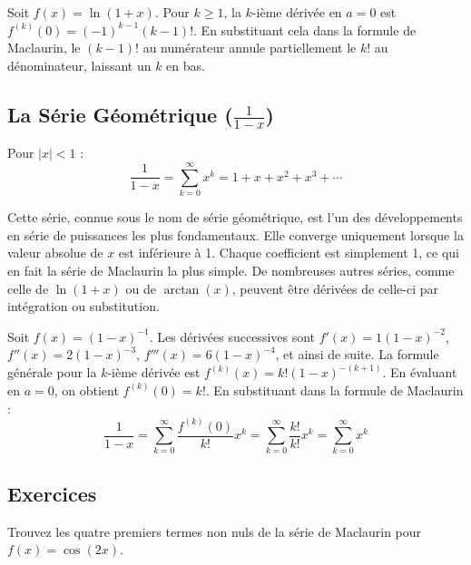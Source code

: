 \begin{proofbox}
Soit $f(x) = \ln(1+x)$. Pour $k \ge 1$, la $k$-ième dérivée en $a=0$ est $f^{(k)}(0) = (-1)^{k-1} (k-1)!$. En substituant cela dans la formule de Maclaurin, le $(k-1)!$ au numérateur annule partiellement le $k!$ au dénominateur, laissant un $k$ en bas.
\end{proofbox}

\subsection{La Série Géométrique ($\frac{1}{1-x}$)}

\begin{theorembox}
Pour $|x| < 1$ :
$$ \frac{1}{1-x} = \sum_{k=0}^{\infty} x^k = 1 + x + x^2 + x^3 + \cdots $$
\end{theorembox}

\begin{intuitionbox}
Cette série, connue sous le nom de série géométrique, est l'un des développements en série de puissances les plus fondamentaux. Elle converge uniquement lorsque la valeur absolue de $x$ est inférieure à 1. Chaque coefficient est simplement 1, ce qui en fait la série de Maclaurin la plus simple. De nombreuses autres séries, comme celle de $\ln(1+x)$ ou de $\arctan(x)$, peuvent être dérivées de celle-ci par intégration ou substitution.
\end{intuitionbox}

\begin{proofbox}
Soit $f(x) = (1-x)^{-1}$. Les dérivées successives sont $f'(x) = 1(1-x)^{-2}$, $f''(x) = 2(1-x)^{-3}$, $f'''(x) = 6(1-x)^{-4}$, et ainsi de suite. La formule générale pour la $k$-ième dérivée est $f^{(k)}(x) = k!(1-x)^{-(k+1)}$. En évaluant en $a=0$, on obtient $f^{(k)}(0) = k!$. En substituant dans la formule de Maclaurin :
$$ \frac{1}{1-x} = \sum_{k=0}^{\infty} \frac{f^{(k)}(0)}{k!} x^k = \sum_{k=0}^{\infty} \frac{k!}{k!} x^k = \sum_{k=0}^{\infty} x^k $$
\end{proofbox}

\subsection{Exercices}

\begin{exercicebox}
Trouvez les quatre premiers termes non nuls de la série de Maclaurin pour $f(x) = \cos(2x)$.
\end{exercicebox}

